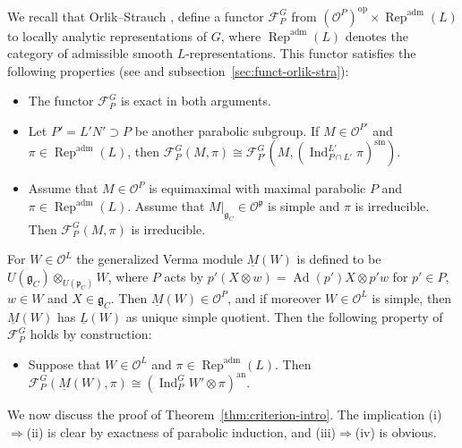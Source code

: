 \documentclass[a4paper]{amsart}
\numberwithin{equation}{section}
\theoremstyle{remark}
\theoremstyle{definition}
\DeclareMathOperator{\Ind}{Ind}
\DeclareMathOperator{\AnInd}{Ind}
\DeclareMathOperator{\Ad}{Ad}
\DeclareMathOperator{\Rep}{Rep}
\newcommand{\sm}{\mathrm{sm}}
\newcommand{\adm}{\mathrm{adm}}
\newcommand{\an}{\mathrm{an}}
\newcommand{\opp}{\mathrm{op}}
\renewcommand{\simeq}{\cong}
\begin{document}
We recall that Orlik--Strauch \cite{OS2}, \cite{OS3} define a functor $\mathcal{F}_{P}^{G}$ from $(\mathcal{O}^{P})^{\opp}\times \Rep^{\adm}(L)$ to locally analytic representations of $G$, where $\Rep^{\adm}(L)$ denotes the category of admissible smooth $L$-representations.
This functor satisfies the following properties (see \cite{OS3} and subsection~\ref{sec:funct-orlik-stra}):
\begin{itemize}
\item The functor $\mathcal{F}_{P}^{G}$ is exact in both arguments.
\item Let $P' = L'N'\supset P$ be another parabolic subgroup.
If $M\in \mathcal{O}^{P'}$ and $\pi\in\Rep^{\adm}(L)$, then $\mathcal{F}_{P}^{G}(M,\pi)\simeq \mathcal{F}_{P'}^{G}(M,(\Ind_{P \cap L'}^{L'}\pi)^{\sm})$.
\item Assume that $M\in \mathcal{O}^{P}$ is equimaximal with maximal parabolic $P$ and $\pi \in \Rep^{\adm}(L)$.
Assume that $M|_{\mathfrak{g}_{C}} \in \mathcal O^{\mathfrak p}$ is simple and $\pi$ is irreducible.
Then $\mathcal{F}_{P}^{G}(M,\pi)$ is irreducible.
\end{itemize}
For $W\in \mathcal{O}^{L}$ the generalized Verma module $\underline{M}(W)$ is defined to be $U(\mathfrak{g}_{C})\otimes_{U(\mathfrak{p}_{C})}W$, where $P$ acts by $p'(X\otimes w) = \Ad(p')X\otimes p'w$ for $p'\in P$, $w\in W$ and $X\in \mathfrak{g}_{C}$.
Then $\underline{M}(W)\in \mathcal{O}^{P}$, and if moreover $W\in \mathcal O^L$ is simple, then $\underline{M}(W)$ has $\underline{L}(W)$ as unique simple quotient.
Then the following property of $\mathcal{F}_{P}^{G}$ holds by construction:
\begin{itemize}
\item Suppose that $W \in \mathcal O^L$ and $\pi \in \Rep^{\adm}(L)$.
  Then $\mathcal{F}_{P}^{G}(\underline M(W),\pi) \cong (\AnInd_{P}^{G}W'\otimes\pi)^{\an}$.
\end{itemize}


We now discuss the proof of Theorem~\ref{thm:criterion-intro}.
The implication (i)$\Rightarrow$(ii) is clear by exactness of parabolic induction, and (iii)$\Rightarrow$(iv) is obvious.
\end{document}
